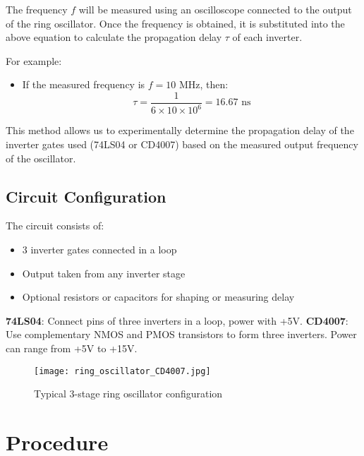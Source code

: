 \documentclass[conference]{IEEEtran}
\begin{document}
\noindent The frequency $f$ will be measured using an oscilloscope connected to the output of the ring oscillator. Once the frequency is obtained, it is substituted into the above equation to calculate the propagation delay $\tau$ of each inverter.

\noindent For example:
\begin{itemize}
    \item If the measured frequency is $f = 10$ MHz, then:
    \[
    \tau = \frac{1}{6 \times 10 \times 10^6} = 16.67 \text{ ns}
    \]
\end{itemize}

\noindent This method allows us to experimentally determine the propagation delay of the inverter gates used (74LS04 or CD4007) based on the measured output frequency of the oscillator.


\subsection{Circuit Configuration}
\noindent The circuit consists of:
\begin{itemize}
    \item 3 inverter gates connected in a loop
    \item Output taken from any inverter stage
    \item Optional resistors or capacitors for shaping or measuring delay
\end{itemize}

\noindent \textbf{74LS04}: Connect pins of three inverters in a loop, power with +5V.  
\noindent \textbf{CD4007}: Use complementary NMOS and PMOS transistors to form three inverters. Power can range from +5V to +15V.

\begin{figure}[H]
\centering
\texttt{[image: ring\_oscillator\_CD4007.jpg]}
\caption{Typical 3-stage ring oscillator configuration}
\label{fig:ring_oscillator}
\end{figure}

\section{Procedure}
\end{document}
